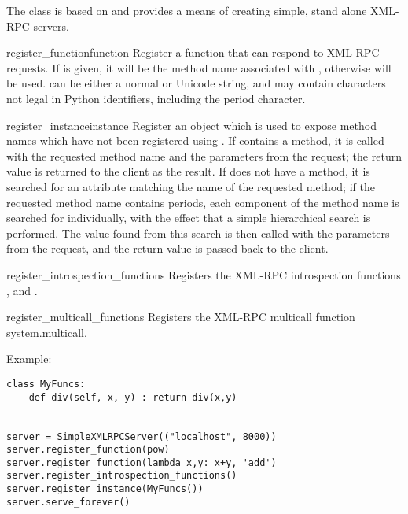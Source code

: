 The  class is based on
 and provides a means of creating
simple, stand alone XML-RPC servers.

\begin{methoddesc}[SimpleXMLRPCServer]{register_function}{function}
  Register a function that can respond to XML-RPC requests.  If
   is given, it will be the method name associated with
  , otherwise  will be
  used.   can be either a normal or Unicode string, and may
  contain characters not legal in Python identifiers, including the
  period character.
\end{methoddesc}

\begin{methoddesc}[SimpleXMLRPCServer]{register_instance}{instance}
  Register an object which is used to expose method names which have
  not been registered using .  If
   contains a  method, it is called
  with the requested method name and the parameters from the request;
  the return value is returned to the client as the result.  If
   does not have a  method, it is
  searched for an attribute matching the name of the requested method;
  if the requested method name contains periods, each component of the
  method name is searched for individually, with the effect that a
  simple hierarchical search is performed.  The value found from this
  search is then called with the parameters from the request, and the
  return value is passed back to the client.
\end{methoddesc}

\begin{methoddesc}{register_introspection_functions}{}
  Registers the XML-RPC introspection functions ,
   and . 
\end{methoddesc}

\begin{methoddesc}{register_multicall_functions}{}
  Registers the XML-RPC multicall function system.multicall.
\end{methoddesc}

Example:

\begin{verbatim}
class MyFuncs:
    def div(self, x, y) : return div(x,y)


server = SimpleXMLRPCServer(("localhost", 8000))
server.register_function(pow)
server.register_function(lambda x,y: x+y, 'add')
server.register_introspection_functions()
server.register_instance(MyFuncs())
server.serve_forever()
\end{verbatim}

